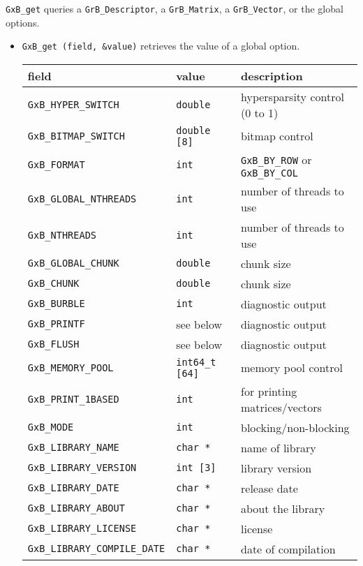 \documentclass[12pt]{article}
\begin{document}
{\verb'GxB_get' queries a \verb'GrB_Descriptor', a \verb'GrB_Matrix',
a \verb'GrB_Vector', or the global options.

\begin{itemize}

\item \verb'GxB_get (field, &value)' retrieves the value of a global option.

{\footnotesize
\begin{tabular}{lll}
field                       & value         & description \\
\hline
\verb'GxB_HYPER_SWITCH'     & \verb'double' & hypersparsity control (0 to 1) \\
\verb'GxB_BITMAP_SWITCH'    & \verb'double [8]' & bitmap control \\
\verb'GxB_FORMAT'           & \verb'int'    & \verb'GxB_BY_ROW' or \verb'GxB_BY_COL' \\
\verb'GxB_GLOBAL_NTHREADS'  & \verb'int'    & number of threads to use \\
\verb'GxB_NTHREADS'         & \verb'int'    & number of threads to use \\
\verb'GxB_GLOBAL_CHUNK'     & \verb'double' & chunk size \\
\verb'GxB_CHUNK'            & \verb'double' & chunk size \\
\verb'GxB_BURBLE'           & \verb'int'    & diagnostic output \\
\verb'GxB_PRINTF'           & see below     & diagnostic output \\
\verb'GxB_FLUSH'            & see below     & diagnostic output \\
\verb'GxB_MEMORY_POOL'      & \verb'int64_t [64]' & memory pool control \\
\verb'GxB_PRINT_1BASED'     & \verb'int'    & for printing matrices/vectors \\
\verb'GxB_MODE'                 & \verb'int'    & blocking/non-blocking \\
\verb'GxB_LIBRARY_NAME'         & \verb'char *' & name of library \\
\verb'GxB_LIBRARY_VERSION'      & \verb'int [3]' & library version \\
\verb'GxB_LIBRARY_DATE'         & \verb'char *' & release date \\
\verb'GxB_LIBRARY_ABOUT'        & \verb'char *' & about the library \\
\verb'GxB_LIBRARY_LICENSE'      & \verb'char *' & license \\
\verb'GxB_LIBRARY_COMPILE_DATE' & \verb'char *' & date of compilation \\

\end{tabular}}
\end{itemize}}
\end{document}
